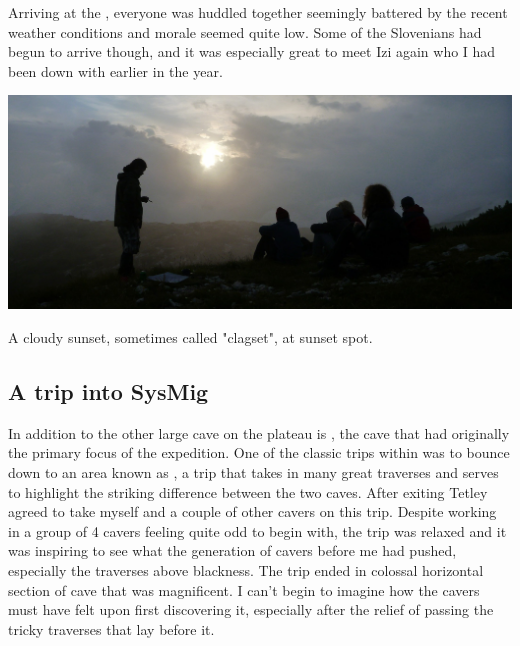Arriving at the , everyone was huddled together seemingly battered
by the recent weather conditions and morale seemed quite low. Some of the
Slovenians had begun to arrive though, and it was especially great to
meet Izi again who I had been down  with earlier in the
year.


\begin{pagefigure}
\checkoddpage \ifoddpage \forcerectofloat \else \forceversofloat \fi
   \centering
\includegraphics[width = \textwidth]{2011/alex_pitcher_award/2011-07-30-18.57.51-Grega-Panasonc DMC-FT2-019--orig.jpg}
\caption{A cloudy sunset, sometimes called "clagset", at sunset spot. } \label{cloudy sunset}
\end{pagefigure}


\subsection{A trip into SysMig}

In addition to  the other large cave on the plateau is
, the cave that had originally the primary focus of the
expedition. One of the classic trips within  was to bounce
down to an area known as , a trip that takes in many great
traverses and serves to highlight the striking difference between the
two caves. After exiting  Tetley agreed to take myself
and a couple of other cavers on this trip. Despite working in a group of
4 cavers feeling quite odd to begin with, the trip was relaxed and it
was inspiring to see what the generation of cavers before me had pushed,
especially the traverses above blackness. The trip ended in colossal
horizontal section of cave that was magnificent. I can't begin to
imagine how the cavers must have felt upon first discovering it,
especially after the relief of passing the tricky traverses that lay
before it.

